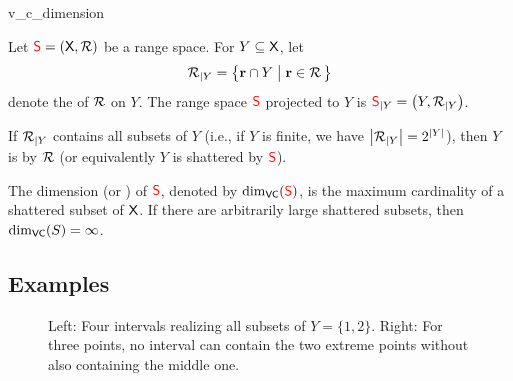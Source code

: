 

\begin{fragment}{v_c_dimension}
    \begin{defn}
        Let ${\textcolor{red}{\mathsf{S}}} = (\textsf{X},{\mathcal{R}})$ be a range
        space. For $Y \subseteq \textsf{X}$, let
        \begin{equation}
            \VCProj{\RangeSet}{Y}%
            =%
            \Set{\range \cap Y}{ \range \in \RangeSet\bigr.\,}
            \eqlab{v:c:project}
        \end{equation}
        denote the  of
        ${\mathcal{R}}$ on $Y$. The range space ${\textcolor{red}{\mathsf{S}}}$ projected to
        $Y$ is $\VCProj{\RangeSpace}{Y} = \pth{Y,
           \VCProj{\RangeSet}{Y}}$.
        
        If ${\mathcal{R}}_{|Y}$ contains all subsets of $Y$ (i.e.,
        if $Y$ is finite, we have $\left| {{\mathcal{R}}_{|Y}} \right| =
        2^{\left| {Y} \right|}$), then $Y$ is  by ${\mathcal{R}}$
        (or equivalently $Y$ is shattered by ${\textcolor{red}{\mathsf{S}}}$).
        
        The  dimension (or
        ) of
        ${\textcolor{red}{\mathsf{S}}}$, denoted by $\mathrm{dim}_{\mathsf{VC}}({\textcolor{red}{\mathsf{S}}})$, is the
        maximum cardinality of a shattered subset of $\textsf{X}$. If
        there are arbitrarily large shattered subsets, then
        $\mathrm{dim}_{\mathsf{VC}}(S) = \infty$.
    \end{defn}
\end{fragment}



\subsection{Examples}




\begin{figure}[t]
    \phantom{}
    \hfill%
    \hfill%
    \hfill{}
    \phantom{}

    \caption{Left: Four intervals realizing all subsets of
       $Y = \{1,2\}$. Right: For three points, no interval
       can contain the two extreme points without also
       containing the middle one.}
\end{figure}

